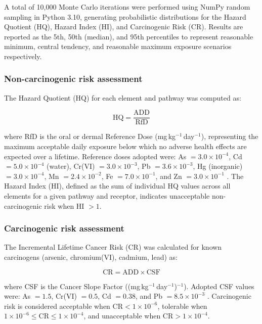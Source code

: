 \documentclass[preprint,12pt,number]{elsarticle}
\begin{document}
\noindent A total of 10,000 Monte Carlo iterations were performed using NumPy random sampling in Python 3.10, generating probabilistic distributions for the Hazard Quotient (HQ), Hazard Index (HI), and Carcinogenic Risk (CR). Results are reported as the 5th, 50th (median), and 95th percentiles to represent reasonable minimum, central tendency, and reasonable maximum exposure scenarios respectively.

\subsubsection{Non-carcinogenic risk assessment}

The Hazard Quotient (HQ) for each element and pathway was computed as:

\begin{equation}
\text{HQ} = \frac{\text{ADD}}{\text{RfD}}
\label{eq:hq}
\end{equation}

\noindent where RfD is the oral or dermal Reference Dose (mg\,kg$^{-1}$\,day$^{-1}$), representing the maximum acceptable daily exposure below which no adverse health effects are expected over a lifetime. Reference doses adopted were: As $= 3.0 \times 10^{-4}$, Cd $= 5.0 \times 10^{-4}$ (water), Cr(VI) $= 3.0 \times 10^{-3}$, Pb $= 3.6 \times 10^{-3}$, Hg (inorganic) $= 3.0 \times 10^{-4}$, Mn $= 2.4 \times 10^{-2}$, Fe $= 7.0 \times 10^{-1}$, and Zn $= 3.0 \times 10^{-1}$ \cite{USEPA2011}. The Hazard Index (HI), defined as the sum of individual HQ values across all elements for a given pathway and receptor, indicates unacceptable non-carcinogenic risk when HI $> 1$.

\subsubsection{Carcinogenic risk assessment}

The Incremental Lifetime Cancer Risk (CR) was calculated for known carcinogens (arsenic, chromium(VI), cadmium, lead) as:

\begin{equation}
\text{CR} = \text{ADD} \times \text{CSF}
\label{eq:cr}
\end{equation}

\noindent where CSF is the Cancer Slope Factor ((mg\,kg$^{-1}$\,day$^{-1}$)$^{-1}$). Adopted CSF values were: As $= 1.5$, Cr(VI) $= 0.5$, Cd $= 0.38$, and Pb $= 8.5 \times 10^{-3}$ \cite{USEPA2011}. Carcinogenic risk is considered acceptable when $\text{CR} < 1 \times 10^{-6}$, tolerable when $1 \times 10^{-6} \leq \text{CR} \leq 1 \times 10^{-4}$, and unacceptable when $\text{CR} > 1 \times 10^{-4}$.
\end{document}
